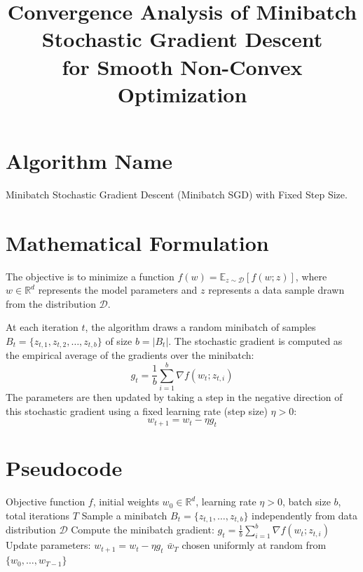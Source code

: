 \documentclass{article}
\title{Convergence Analysis of Minibatch Stochastic Gradient Descent\\for Smooth Non-Convex Optimization}
\author{}
\date{}
\begin{document}
\maketitle

\section*{Algorithm Name}
Minibatch Stochastic Gradient Descent (Minibatch SGD) with Fixed Step Size.

\section*{Mathematical Formulation}
The objective is to minimize a function $f(w) = \mathbb{E}_{z \sim \mathcal{D}}[f(w; z)]$, where $w \in \mathbb{R}^d$ represents the model parameters and $z$ represents a data sample drawn from the distribution $\mathcal{D}$. 

At each iteration $t$, the algorithm draws a random minibatch of samples $B_t = \{z_{t,1}, z_{t,2}, \dots, z_{t,b}\}$ of size $b = |B_t|$. The stochastic gradient is computed as the empirical average of the gradients over the minibatch:
\begin{equation}
    g_t = \frac{1}{b} \sum_{i=1}^b \nabla f(w_t; z_{t,i})
\end{equation}
The parameters are then updated by taking a step in the negative direction of this stochastic gradient using a fixed learning rate (step size) $\eta > 0$:
\begin{equation}
    w_{t+1} = w_t - \eta g_t
\end{equation}

\section*{Pseudocode}
\begin{algorithm}[H]
\caption{Minibatch Stochastic Gradient Descent (Fixed Step Size)}
\begin{algorithmic}[1]
\REQUIRE Objective function $f$, initial weights $w_0 \in \mathbb{R}^d$, learning rate $\eta > 0$, batch size $b$, total iterations $T$
    \STATE Sample a minibatch $B_t = \{z_{t,1}, \dots, z_{t,b}\}$ independently from data distribution $\mathcal{D}$
    \STATE Compute the minibatch gradient: $g_t = \frac{1}{b} \sum_{i=1}^b \nabla f(w_t; z_{t,i})$
    \STATE Update parameters: $w_{t+1} = w_t - \eta g_t$
\ENDFOR
\RETURN $\bar{w}_T$ chosen uniformly at random from $\{w_0, \dots, w_{T-1}\}$
\end{algorithmic}
\end{algorithm}
\end{document}
